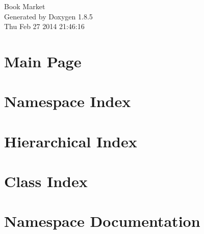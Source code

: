 \documentclass[twoside]{book}
\newcommand{\clearemptydoublepage}{%
  \newpage{\pagestyle{empty}\cleardoublepage}%
}
\begin{document}
\hypersetup{pageanchor=false}
\begin{titlepage}
\vspace*{7cm}
\begin{center}%
{\Large Book Market }\\
\vspace*{1cm}
{\large Generated by Doxygen 1.8.5}\\
\vspace*{0.5cm}
{\small Thu Feb 27 2014 21:46:16}\\
\end{center}
\end{titlepage}
\clearemptydoublepage
\tableofcontents
\clearemptydoublepage
{}
\hypersetup{pageanchor=true}

\chapter{Main Page}
\label{index}\hypertarget{index}{}
\chapter{Namespace Index}

\chapter{Hierarchical Index}

\chapter{Class Index}

\chapter{Namespace Documentation}

\end{document}
